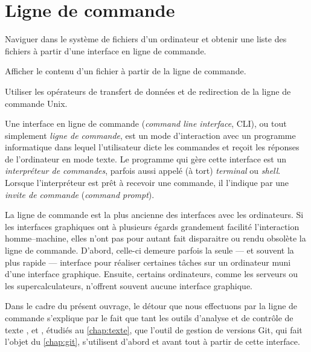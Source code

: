 
\chapter{Ligne de commande}
\label{chap:cli}

\begin{objectifs}
\item Naviguer dans le système de fichiers d'un ordinateur et obtenir
  une liste des fichiers à partir d'une interface en ligne de
  commande.
\item Afficher le contenu d'un fichier à partir de la ligne de
  commande.
\item Utiliser les opérateurs de transfert de données et de
  redirection de la ligne de commande Unix.
\end{objectifs}

Une interface en ligne de commande
(\emph{command line interface}, CLI), ou tout simplement \emph{ligne
  de commande}, est un mode d'interaction avec un programme
informatique dans lequel l'utilisateur dicte les commandes et reçoit
les réponses de l'ordinateur en mode texte. Le programme qui gère
cette interface est un \emph{interpréteur de commandes}, parfois aussi
appelé (à tort) \emph{terminal} ou \emph{shell}. Lorsque
l'interpréteur est prêt à recevoir une commande, il l'indique par une
\emph{invite de commande} (\emph{command prompt}).

La ligne de commande est la plus ancienne des interfaces avec les
ordinateurs. Si les interfaces graphiques ont à plusieurs égards
grandement facilité l'interaction homme--machine, elles n'ont pas pour
autant fait disparaitre ou rendu obsolète la ligne de commande.
D'abord, celle-ci demeure parfois la seule --- et souvent la plus
rapide --- interface pour réaliser certaines tâches sur un ordinateur
muni d'une interface graphique. Ensuite, certains ordinateurs, comme
les serveurs ou les supercalculateurs, n'offrent souvent aucune
interface graphique.

Dans le cadre du présent ouvrage, le détour que nous effectuons par la
ligne de commande s'explique par le fait que tant les outils d'analyse
et de contrôle de texte ,  et ,
étudiés au \autoref{chap:texte}, que l'outil de gestion de versions
Git, qui fait l'objet du \autoref{chap:git}, s'utilisent d'abord et
avant tout à partir de cette interface.


